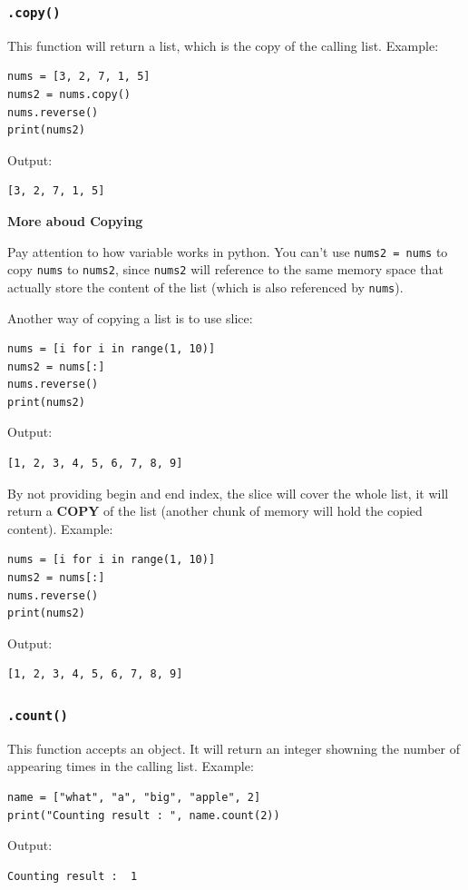 \documentclass[12pt]{book}
\begin{document}
\subsubsection{\texttt{.copy()}}
\label{sec:org990edb1}
This function will return a list, which is the copy of the calling list. Example:
\begin{verbatim}
nums = [3, 2, 7, 1, 5]
nums2 = nums.copy()
nums.reverse()
print(nums2)
\end{verbatim}
Output:
\begin{verbatim}
[3, 2, 7, 1, 5]
\end{verbatim}

\textbf{More aboud Copying}

Pay attention to how variable works in python. You can't use \texttt{nums2 = nums} to copy \texttt{nums} to \texttt{nums2}, since \texttt{nums2} will reference to the same memory space that actually store the content of the list (which is also referenced by \texttt{nums}).

Another way of copying a list is to use slice:
\begin{verbatim}
nums = [i for i in range(1, 10)]
nums2 = nums[:]
nums.reverse()
print(nums2)
\end{verbatim}
Output:
\begin{verbatim}
[1, 2, 3, 4, 5, 6, 7, 8, 9]
\end{verbatim}
By not providing begin and end index, the slice will cover the whole list, it will return a \textbf{COPY} of the list (another chunk of memory will hold the copied content). Example:
\begin{verbatim}
nums = [i for i in range(1, 10)]
nums2 = nums[:]
nums.reverse()
print(nums2)
\end{verbatim}
Output:
\begin{verbatim}
[1, 2, 3, 4, 5, 6, 7, 8, 9]
\end{verbatim}
\subsubsection{\texttt{.count()}}
\label{sec:org2b422e3}
This function accepts an object. It will return an integer showning the number of appearing times in the calling list. Example:
\begin{verbatim}
name = ["what", "a", "big", "apple", 2]
print("Counting result : ", name.count(2))
\end{verbatim}
Output:
\begin{verbatim}
Counting result :  1
\end{verbatim}
\end{document}
